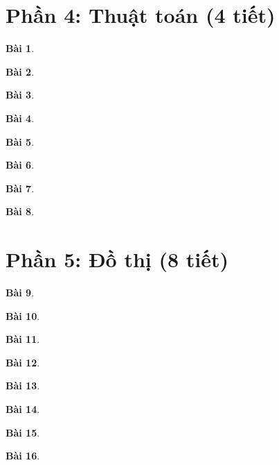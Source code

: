 \documentclass[11pt, oneside,openright,a4paper]{book}
\newtheorem{bt}{Bài }[section]
\begin{document}
\section[Phần 4. Thuật toán (4 tiết)]{Phần 4: Thuật toán (4 tiết)}

 \begin{bt}

\end{bt}
\begin{bt}

\end{bt}
\begin{bt}

\end{bt}
\begin{bt}

\end{bt}
\begin{bt}

\end{bt}
\begin{bt}

\end{bt}
\begin{bt}

\end{bt}
\begin{bt}

\end{bt}
 \newpage
\section[Phần 5. Đồ thị (8 tiết)]{Phần 5: Đồ thị (8 tiết)}

 \begin{bt}

\end{bt}
\begin{bt}

\end{bt}
\begin{bt}

\end{bt}
\begin{bt}

\end{bt}
\begin{bt}

\end{bt}
\begin{bt}

\end{bt}
\begin{bt}

\end{bt}
\begin{bt}

\end{bt}
\end{document}
